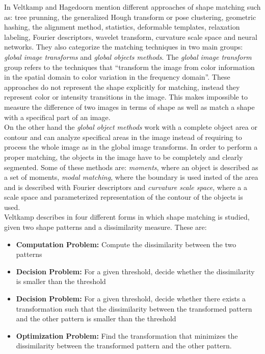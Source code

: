 In \cite{matchingbook} Veltkamp and Hagedoorn mention different 
approaches of shape matching such as: tree prunning, the
generalized Hough transform or pose clustering, geometric hashing,
the alignment method, statistics, deformable templates, relaxation
labeling, Fourier descriptors, wavelet transform, curvature
scale space and neural networks.
They also categorize the matching techniques in two main groups:
\emph{global image transforms} and \emph{global objects methods}.
The \emph{global image transform} group refers to the techniques that
``transform the image from color information in the spatial
domain to color variation in the frequency domain''. 
These approaches do not represent the shape explicitly for 
matching, instead they represent color or intensity transitions 
in the image. This makes impossible to measure the difference of 
two images in terms of shape as well as match a shape with a 
specifical part of an image.\\
On the other hand the \emph{global object methods} work with a complete
object area or contour and can analyze specifical areas in the 
image instead of requiring to process the whole image as in 
the global image transforms. In order to perform a proper
matching, the objects in the image have to be completely and
clearly segmented. Some of these methods are: \emph{moments}, where an
object is described as a set of moments, \emph{modal matching},
where the boundary is used insted of the area and is described 
with Fourier descriptors and \emph{curvature scale space}, where a a
scale space and parameterized representation of the contour of the 
objects is used.\\

Veltkamp describes in \cite{matching2} four different forms in
which shape matching is studied, given two shape patterns
and a dissimilarity measure. These are:

\begin{itemize}
\item \textbf{Computation Problem: }Compute the dissimilarity
  between the two patterns
\item \textbf{Decision Problem: }For a given threshold, decide
  whether the dissimilarity is smaller than the threshold
\item \textbf{Decision Problem: }For a given threshold, decide
  whether there exists a transformation such that the
dissimilarity between the transformed pattern and the other 
pattern is smaller than the threshold
\item \textbf{Optimization Problem: }Find the transformation
that minimizes the dissimilarity between the transformed
pattern and the other pattern.
\end{itemize}

